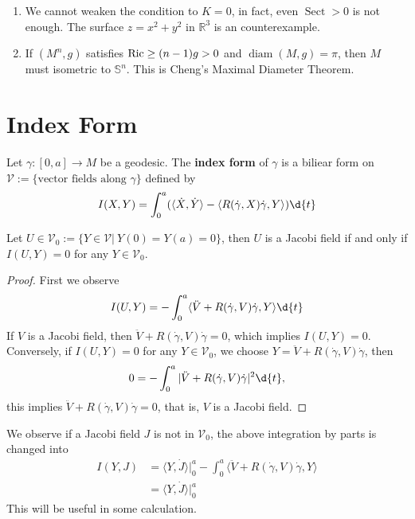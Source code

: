 \begin{rem}
    \begin{enumerate}[(1)]
        \item We cannot weaken the condition to $K=0$, in fact, even $\operatorname{Sect}>0$ is not enough.
        The surface $z=x^2+y^2$ in $\mathbb{R}^3$ is an counterexample.
        \item If $(M^n,g)$ satisfies $\operatorname{Ric}\geq(n-1)g>0$ and $\operatorname{diam}(M,g)=\pi$, then $M$ must isometric to $\mathbb{S}^n$.
        This is Cheng's Maximal Diameter Theorem.
    \end{enumerate}
\end{rem}

\section{Index Form}

\begin{defn}
    Let $\gamma:[0,a]\to M$ be a geodesic.
    The \textbf{index form} of $\gamma$ is a biliear form on $\mathscr{V}:=\{\text{vector fields along }\gamma\}$ defined by
    \[I(X,Y)=\int_0^a(\langle\dot{X},\dot{Y}\rangle-\langle R(\dot{\gamma},{X})\dot{\gamma},{Y}\rangle)\d{t}\]
\end{defn}

\begin{lem}\label{jacobi field and index form}
    Let $U\in\mathscr{V}_0:=\{Y\in\mathscr{V}|\ Y(0)=Y(a)=0\}$, then $U$ is a Jacobi field if and only if $I(U,Y)=0$ for any $Y\in\mathscr{V}_0$.
\end{lem}
\begin{proof}
    First we observe
    \[I(U,Y)=-\int_0^a\langle\ddot{V}+R(\dot{\gamma},V)\dot{\gamma},Y\rangle\d{t}\]
    If $V$ is a Jacobi field, then $\ddot{V}+R(\dot{\gamma},V)\dot{\gamma}=0$, which implies $I(U,Y)=0$.
    Conversely, if $I(U,Y)=0$ for any $Y\in\mathscr{V}_0$, we choose $Y=\ddot{V}+R(\dot{\gamma},V)\dot{\gamma}$, then
    \[0=-\int_0^a|\ddot{V}+R(\dot{\gamma},V)\dot{\gamma}|^2\d{t},\]
    this implies $\ddot{V}+R(\dot{\gamma},V)\dot{\gamma}=0$, that is, $V$ is a Jacobi field.
\end{proof}

We observe if a Jacobi field $J$ is not in $\mathscr{V}_0$, the above integration by parts is changed into
\begin{equation}
    \begin{aligned}
        I(Y,J)&=\langle Y,\dot{J}\rangle|_0^a-\int_0^a\langle\ddot{V}+R(\dot{\gamma},V)\dot{\gamma},Y\rangle\\
        &=\langle Y,\dot{J}\rangle|_0^a
    \end{aligned}\label{jacobi field and index form 2}
\end{equation}
This will be useful in some calculation.

